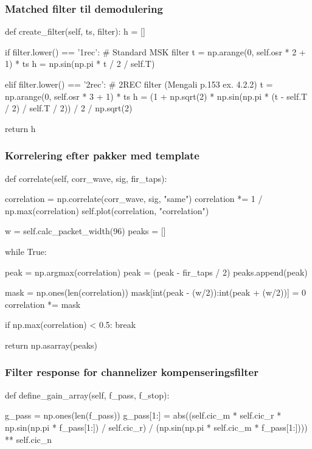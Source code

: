 \begin{appendices}
\subsubsection{Matched filter til demodulering}
\begin{python}
	def create_filter(self, ts, filter):
	h = []
	
	if filter.lower() == '1rec':
	# Standard MSK filter
	t = np.arange(0, self.osr * 2 + 1) * ts
	h = np.sin(np.pi * t / 2 / self.T)
	
	elif filter.lower() == '2rec':
	# 2REC filter (Mengali p.153 ex. 4.2.2)
	t = np.arange(0, self.osr * 3 + 1) * ts
	h = (1 + np.sqrt(2) * np.sin(np.pi * (t - self.T / 2) / self.T / 2)) / 2 / np.sqrt(2)
	
	return h
\end{python}

\subsubsection{Korrelering efter pakker med template}
\begin{python}
	
	def correlate(self, corr_wave, sig, fir_taps):
	
	correlation = np.correlate(corr_wave, sig, "same")
	correlation *= 1 / np.max(correlation)
	self.plot(correlation, "correlation")
	
	w = self.calc_packet_width(96)
	peaks = []
	
	while True:
	
	peak = np.argmax(correlation)
	peak = (peak - fir_taps / 2)
	peaks.append(peak)
	
	mask = np.ones(len(correlation))
	mask[int(peak - (w/2)):int(peak + (w/2))] = 0
	correlation *= mask
	
	if np.max(correlation) < 0.5:
	break
	
	return np.asarray(peaks)
\end{python}

\pagebreak
\subsubsection{Filter response for channelizer kompenseringsfilter}
\begin{python}
	def define_gain_array(self, f_pass, f_stop):
	
	g_pass = np.ones(len(f_pass))
	g_pass[1:] = abs((self.cic_m * self.cic_r * np.sin(np.pi * f_pass[1:]) / self.cic_r) /
	(np.sin(np.pi * self.cic_m * f_pass[1:]))) ** self.cic_n
	

\end{python}
\end{appendices}
